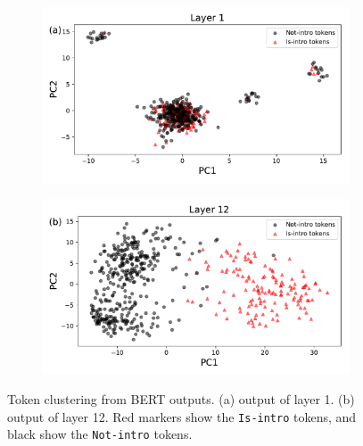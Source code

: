 \begin{figure}
    \centering
    \begin{subfigure}[h]{0.5\textwidth}
\includegraphics[width=\textwidth]{paper/figs/bert_pca_layer1_sm.pdf}
        \label{fig:bert_layer_1}
    \end{subfigure}
    \begin{subfigure}[h]{0.5\textwidth}
        \includegraphics[width=\textwidth, ]{paper/figs/bert_pca_layer12_sm.pdf}
        \label{fig:bert_layer_12}
    \end{subfigure}
    \caption{Token clustering from BERT outputs. (a) output of layer 1. (b) output of layer 12. Red markers show the \texttt{Is-intro} tokens, and black show the \texttt{Not-intro} tokens.}
    \label{fig:bert_layers}
\end{figure}
